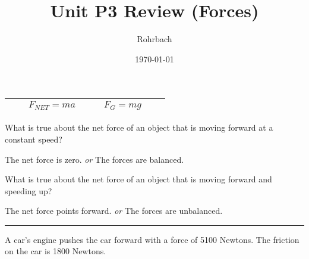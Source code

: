 \documentclass[10pt]{exam}
\title{Unit P3 Review (Forces)}
\author{Rohrbach}
\date{\today}
\newcommand{\hforce}[2]{
  \draw[f] (a) -- ++(#1, 0) 
        node[anchor=south] {#2};
}
\newcommand{\vforce}[2]{
  \draw[f] (a) -- ++(0, #1) 
        node[anchor=west] {#2};
}
\newcommand{\printeqs}{
  \ifprintanswers
  \else
    \begin{center}
      \begin{tabular}{|*8c|}
        \hline 
        && $F_{NET} = ma$ & & & $F_G =mg$ &&\\
        \hline
      \end{tabular}
    \end{center}
  \fi
}
\begin{document}
\maketitle

\printeqs 
\begin{questions}
  \question
    What is true about the net force of an object that is moving forward at a constant speed?

    \begin{solution}[\stretch{1}]
      The net force is zero. \emph{or} The forces are balanced.
    \end{solution}

  \question
    What is true about the net force of an object that is moving forward and speeding up?

    \begin{solution}[\stretch{2}]
      The net force points forward. \emph{or} The forces are unbalanced.
    \end{solution}

    \hrule
    \question
    A car's engine pushes the car forward with a force of 5100 Newtons.  The friction on the car is 1800 Newtons.

\end{questions}
\end{document}
